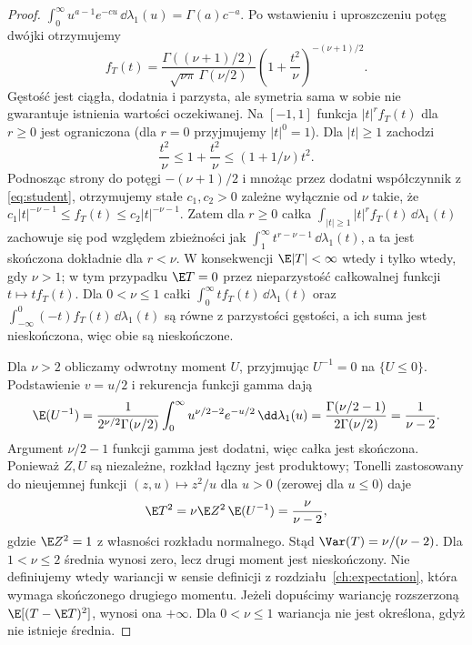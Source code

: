 \begin{proof}
$\int_0^\infty u^{a-1}e^{-cu}\,\dd\lambda_1(u)
=\Gamma(a)c^{-a}$.
Po wstawieniu i uproszczeniu potęg dwójki
otrzymujemy
\[
f_T(t)=\frac{\Gamma((\nu+1)/2)}
{\sqrt{\nu\pi}\,\Gamma(\nu/2)}
\left(1+\frac{t^2}{\nu}\right)^{-(\nu+1)/2}.
\]
Gęstość jest ciągła, dodatnia i parzysta, ale symetria
sama w sobie nie gwarantuje istnienia wartości oczekiwanej.
Na $[-1,1]$ funkcja $|t|^rf_T(t)$ dla $r\geq0$
jest ograniczona (dla $r=0$ przyjmujemy $|t|^0=1$).
Dla $|t|\geq1$ zachodzi
\[
\frac{t^2}{\nu}\leq1+\frac{t^2}{\nu}
\leq(1+1/\nu)t^2.
\]
Podnosząc strony do potęgi $-(\nu+1)/2$ i mnożąc
przez dodatni współczynnik z \eqref{eq:student},
otrzymujemy stałe $c_1,c_2>0$ zależne wyłącznie od $\nu$
takie, że $c_1|t|^{-\nu-1}\leq f_T(t)
\leq c_2|t|^{-\nu-1}$. Zatem dla $r\geq0$
całka $\int_{|t|\geq1}|t|^rf_T(t)\,\dd\lambda_1(t)$
zachowuje się pod względem zbieżności jak
$\int_1^\infty t^{r-\nu-1}\,\dd\lambda_1(t)$,
a ta jest skończona dokładnie dla $r<\nu$.
W konsekwencji $\E|T|<\infty$ wtedy i tylko wtedy,
gdy $\nu>1$; w tym przypadku $\E T=0$ przez
nieparzystość całkowalnej funkcji $t\mapsto tf_T(t)$.
Dla $0<\nu\leq1$ całki
$\int_0^\infty tf_T(t)\,\dd\lambda_1(t)$ oraz
$\int_{-\infty}^0(-t)f_T(t)\,\dd\lambda_1(t)$
są równe z parzystości gęstości, a ich suma jest
nieskończona, więc obie są nieskończone.

Dla $\nu>2$ obliczamy odwrotny moment $U$, przyjmując
$U^{-1}=0$ na $\{U\leq0\}$. Podstawienie $v=u/2$
i rekurencja funkcji gamma dają
\[
\E(U^{-1})=
\frac{1}{2^{\nu/2}\Gamma(\nu/2)}
\int_0^\infty u^{\nu/2-2}e^{-u/2}\,\dd\lambda_1(u)
=\frac{\Gamma(\nu/2-1)}{2\Gamma(\nu/2)}
=\frac1{\nu-2}.
\]
Argument $\nu/2-1$ funkcji gamma jest dodatni,
więc całka jest skończona. Ponieważ $Z,U$ są niezależne,
rozkład łączny jest produktowy; Tonelli zastosowany
do nieujemnej funkcji $(z,u)\mapsto z^2/u$ dla $u>0$
(zerowej dla $u\leq0$) daje
\[
\E T^2=\nu\E Z^2\,\E(U^{-1})
=\frac{\nu}{\nu-2},
\]
gdzie $\E Z^2=1$ z własności rozkładu normalnego.
Stąd $\Var(T)=\nu/(\nu-2)$.
Dla $1<\nu\leq2$ średnia wynosi zero, lecz drugi moment
jest nieskończony. Nie definiujemy wtedy wariancji
w sensie definicji z rozdziału~\ref{ch:expectation},
która wymaga skończonego drugiego momentu.
Jeżeli dopuścimy wariancję rozszerzoną
$\E[(T-\E T)^2]$, wynosi ona $+\infty$.
Dla $0<\nu\leq1$ wariancja nie jest określona,
gdyż nie istnieje średnia.
\end{proof}

